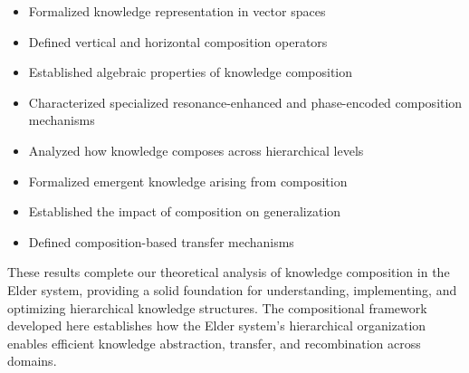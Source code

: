 \begin{itemize}
    \item Formalized knowledge representation in vector spaces
    \item Defined vertical and horizontal composition operators
    \item Established algebraic properties of knowledge composition
    \item Characterized specialized resonance-enhanced and phase-encoded composition mechanisms
    \item Analyzed how knowledge composes across hierarchical levels
    \item Formalized emergent knowledge arising from composition
    \item Established the impact of composition on generalization
    \item Defined composition-based transfer mechanisms
\end{itemize}

These results complete our theoretical analysis of knowledge composition in the Elder system, providing a solid foundation for understanding, implementing, and optimizing hierarchical knowledge structures. The compositional framework developed here establishes how the Elder system's hierarchical organization enables efficient knowledge abstraction, transfer, and recombination across domains.
